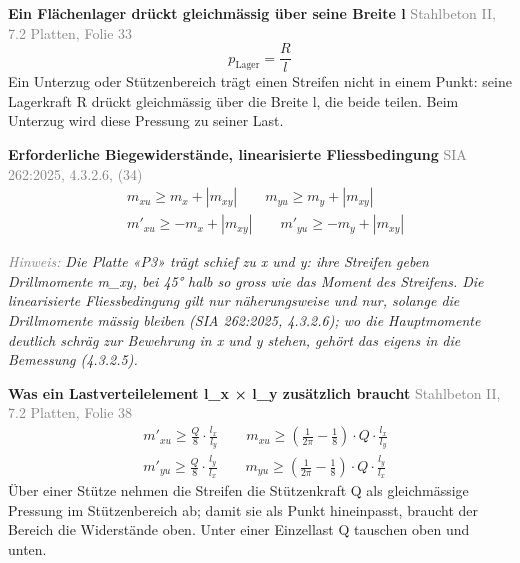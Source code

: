 \documentclass[11pt,a4paper]{article}
\newcommand{\normref}[1]{{\small\textcolor{gray}{#1}}}
\newcommand{\hinweis}[2]{\par\noindent\textcolor{gray}{\textit{#1:}} \textit{#2}\par}
\begin{document}
\noindent\textbf{Ein Flächenlager drückt gleichmässig über seine Breite l} \hfill \normref{Stahlbeton II, 7.2 Platten, Folie 33}
\begin{equation*}
p_{\mathrm{Lager}} = \frac{R}{l}
\end{equation*}
Ein Unterzug oder Stützenbereich trägt einen Streifen nicht in einem Punkt: seine Lagerkraft R drückt gleichmässig über die Breite l, die beide teilen. Beim Unterzug wird diese Pressung zu seiner Last.

\noindent\textbf{Erforderliche Biegewiderstände, linearisierte Fliessbedingung} \hfill \normref{SIA 262:2025, 4.3.2.6, (34)}
\begin{equation*}
\begin{aligned} & m_{xu} \ge m_x + |m_{xy}| \qquad m_{yu} \ge m_y + |m_{xy}| \\ & m'_{xu} \ge -m_x + |m_{xy}| \qquad m'_{yu} \ge -m_y + |m_{xy}| \end{aligned}
\end{equation*}
\hinweis{Hinweis}{Die Platte «P3» trägt schief zu x und y: ihre Streifen geben Drillmomente m\_xy, bei 45° halb so gross wie das Moment des Streifens. Die linearisierte Fliessbedingung gilt nur näherungsweise und nur, solange die Drillmomente mässig bleiben (SIA 262:2025, 4.3.2.6); wo die Hauptmomente deutlich schräg zur Bewehrung in x und y stehen, gehört das eigens in die Bemessung (4.3.2.5).}
\noindent\textbf{Was ein Lastverteilelement l\_x × l\_y zusätzlich braucht} \hfill \normref{Stahlbeton II, 7.2 Platten, Folie 38}
\begin{equation*}
\begin{aligned} & m'_{xu} \ge \frac{Q}{8} \cdot \frac{l_x}{l_y} \qquad m_{xu} \ge \left(\frac{1}{2\pi} - \frac{1}{8}\right) \cdot Q \cdot \frac{l_x}{l_y} \\ & m'_{yu} \ge \frac{Q}{8} \cdot \frac{l_y}{l_x} \qquad m_{yu} \ge \left(\frac{1}{2\pi} - \frac{1}{8}\right) \cdot Q \cdot \frac{l_y}{l_x} \end{aligned}
\end{equation*}
Über einer Stütze nehmen die Streifen die Stützenkraft Q als gleichmässige Pressung im Stützenbereich ab; damit sie als Punkt hineinpasst, braucht der Bereich die Widerstände oben. Unter einer Einzellast Q tauschen oben und unten.
\end{document}
